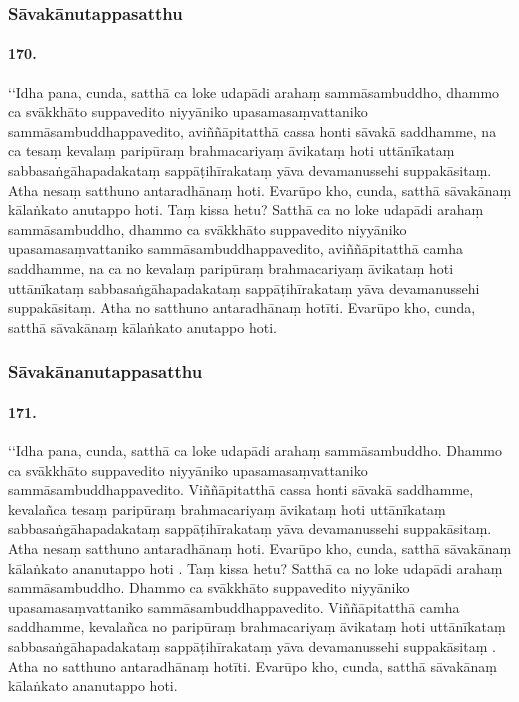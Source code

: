 \subsubsection{Sāvakānutappasatthu}

\paragraph{170.} ‘‘Idha pana, cunda, satthā ca loke udapādi arahaṃ sammāsambuddho, dhammo ca svākkhāto suppavedito niyyāniko upasamasaṃvattaniko sammāsambuddhappavedito, aviññāpitatthā cassa honti sāvakā saddhamme, na ca tesaṃ kevalaṃ paripūraṃ brahmacariyaṃ āvikataṃ hoti uttānīkataṃ sabbasaṅgāhapadakataṃ sappāṭihīrakataṃ yāva devamanussehi suppakāsitaṃ. Atha nesaṃ satthuno antaradhānaṃ hoti. Evarūpo kho, cunda, satthā sāvakānaṃ kālaṅkato anutappo hoti. Taṃ kissa hetu? Satthā ca no loke udapādi arahaṃ sammāsambuddho, dhammo ca svākkhāto suppavedito niyyāniko upasamasaṃvattaniko sammāsambuddhappavedito, aviññāpitatthā camha saddhamme, na ca no kevalaṃ paripūraṃ brahmacariyaṃ āvikataṃ hoti uttānīkataṃ sabbasaṅgāhapadakataṃ sappāṭihīrakataṃ yāva devamanussehi suppakāsitaṃ. Atha no satthuno antaradhānaṃ hotīti. Evarūpo kho, cunda, satthā sāvakānaṃ kālaṅkato anutappo hoti.

\subsubsection{Sāvakānanutappasatthu}

\paragraph{171.} ‘‘Idha pana, cunda, satthā ca loke udapādi arahaṃ sammāsambuddho. Dhammo ca svākkhāto suppavedito niyyāniko upasamasaṃvattaniko sammāsambuddhappavedito. Viññāpitatthā cassa honti sāvakā saddhamme, kevalañca tesaṃ paripūraṃ brahmacariyaṃ āvikataṃ hoti uttānīkataṃ sabbasaṅgāhapadakataṃ sappāṭihīrakataṃ yāva devamanussehi suppakāsitaṃ. Atha nesaṃ satthuno antaradhānaṃ hoti. Evarūpo kho, cunda, satthā sāvakānaṃ kālaṅkato ananutappo hoti . Taṃ kissa hetu? Satthā ca no loke udapādi arahaṃ sammāsambuddho. Dhammo ca svākkhāto suppavedito niyyāniko upasamasaṃvattaniko sammāsambuddhappavedito. Viññāpitatthā camha saddhamme, kevalañca no paripūraṃ brahmacariyaṃ āvikataṃ hoti uttānīkataṃ sabbasaṅgāhapadakataṃ sappāṭihīrakataṃ yāva devamanussehi suppakāsitaṃ . Atha no satthuno antaradhānaṃ hotīti. Evarūpo kho, cunda, satthā sāvakānaṃ kālaṅkato ananutappo hoti.


